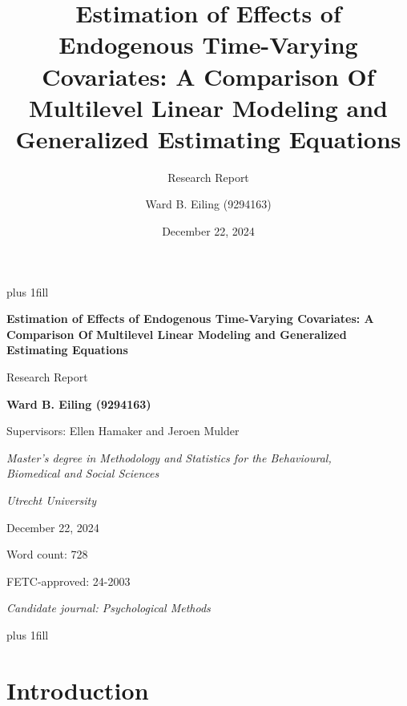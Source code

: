 \documentclass[
  12pt,
  a4paper,
]{article}
\title{Estimation of Effects of Endogenous Time-Varying Covariates: A
Comparison Of Multilevel Linear Modeling and Generalized Estimating
Equations}
\subtitle{Research Report}
\author{Ward B. Eiling (9294163)}
\date{December 22, 2024}
\begin{document}
\cleardoublepage
\thispagestyle{empty}
{\centering
\hbox{}\vskip 0cm plus 1fill
{\Large\bfseries Estimation of Effects of Endogenous Time-Varying
Covariates: A Comparison Of Multilevel Linear Modeling and Generalized
Estimating Equations \par}
\vspace{3ex}
{\large Research Report \par}
\vspace{9ex}
{\large\bfseries Ward B. Eiling (9294163) \par}
\vspace{3ex}
{\large Supervisors: Ellen Hamaker and Jeroen Mulder \par}
\vspace{9ex}
{\normalsize \textit{Master's degree in Methodology and Statistics for the Behavioural, \\ Biomedical and Social Sciences} \par}
\vspace{3ex}
{\normalsize \textit{Utrecht University} \par}
\vspace{9ex}
{\normalsize December 22, 2024 \par}
\vspace{3ex}
{\normalsize Word count: 728 \par}
\vspace{9ex}
{\normalsize FETC-approved: 24-2003 \par}
\vspace{9ex}
{\normalsize \textit{Candidate journal: Psychological Methods} \par}
\hbox{}\vskip 0cm plus 1fill
}

\newpage

\section{Introduction}\label{introduction}
\end{document}
